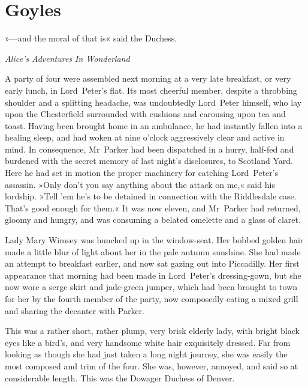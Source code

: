 

\chapter{Goyles}

\epigraph{»—and the moral of that is\longdash« said the Duchess.}{\textit{Alice's Adventures In Wonderland}}

\lettrine[lines=4]{A}{} party of four were assembled next morning at a very late breakfast, or very early lunch, in Lord~Peter's flat. Its most cheerful member, despite a throbbing shoulder and a splitting headache, was undoubtedly Lord~Peter himself, who lay upon the Chesterfield surrounded with cushions and carousing upon tea and toast. Having been brought home in an ambulance, he had instantly fallen into a healing sleep, and had woken at nine o'clock aggressively clear and active in mind. In consequence, Mr~Parker had been dispatched in a hurry, half-fed and burdened with the secret memory of last night's disclosures, to Scotland Yard. Here he had set in motion the proper machinery for catching Lord~Peter's assassin. »Only don't you say anything about the attack on me,« said his lordship. »Tell 'em he's to be detained in connection with the Riddlesdale case. That's good enough for them.« It was now eleven, and Mr~Parker had returned, gloomy and hungry, and was consuming a belated omelette and a glass of claret.

Lady Mary Wimsey was hunched up in the window-seat. Her bobbed golden hair made a little blur of light about her in the pale autumn sunshine.  She had made an attempt to breakfast earlier, and now sat gazing out into Piccadilly. Her first appearance that morning had been made in Lord~Peter's dressing-gown, but she now wore a serge skirt and jade-green jumper, which had been brought to town for her by the fourth member of the party, now composedly eating a mixed grill and sharing the decanter with Parker.

This was a rather short, rather plump, very brisk elderly lady, with bright black eyes like a bird's, and very handsome white hair exquisitely dressed. Far from looking as though she had just taken a long night journey, she was easily the most composed and trim of the four. She was, however, annoyed, and said so at considerable length.  This was the Dowager Duchess of Denver.

